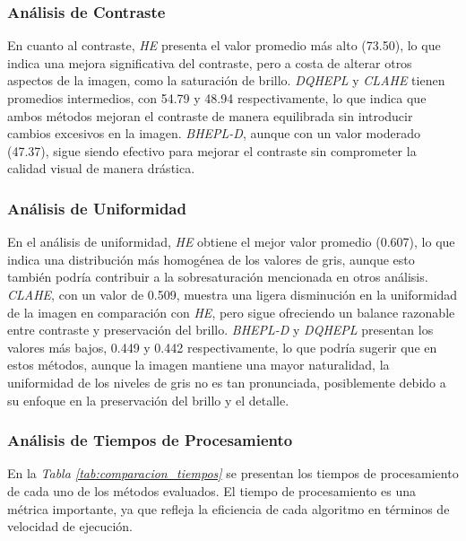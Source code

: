 \documentclass[sigchi]{acmart}
\begin{document}
\subsubsection{\textbf{Análisis de Contraste}}
\label{subsubsec:analisis_contraste}

En cuanto al contraste, \emph{HE} presenta el valor promedio más alto (73.50), lo que indica
una mejora significativa del contraste, pero a costa de alterar otros aspectos de la imagen,
como la saturación de brillo. \emph{DQHEPL} y \emph{CLAHE} tienen promedios intermedios,
con 54.79 y 48.94 respectivamente, lo que indica que ambos métodos mejoran el contraste de
manera equilibrada sin introducir cambios excesivos en la imagen. \emph{BHEPL-D}, aunque con
un valor moderado (47.37), sigue siendo efectivo para mejorar el contraste sin comprometer la
calidad visual de manera drástica.

\subsubsection{\textbf{Análisis de Uniformidad}}
\label{subsubsec:analisis_uniformidad}

En el análisis de uniformidad, \emph{HE} obtiene el mejor valor promedio (0.607), lo que
indica una distribución más homogénea de los valores de gris, aunque esto también podría
contribuir a la sobresaturación mencionada en otros análisis. \emph{CLAHE}, con un valor de
0.509, muestra una ligera disminución en la uniformidad de la imagen en comparación con
\emph{HE}, pero sigue ofreciendo un balance razonable entre contraste y preservación del
brillo. \emph{BHEPL-D} y \emph{DQHEPL} presentan los valores más bajos, 0.449 y 0.442
respectivamente, lo que podría sugerir que en estos métodos, aunque la imagen mantiene una
mayor naturalidad, la uniformidad de los niveles de gris no es tan pronunciada, posiblemente
debido a su enfoque en la preservación del brillo y el detalle.

\subsubsection{\textbf{Análisis de Tiempos de Procesamiento}}
\label{subsubsec:analisis_tiempos}

En la \emph{Tabla \ref{tab:comparacion_tiempos}} se presentan los tiempos de procesamiento de cada uno
de los métodos evaluados. El tiempo de procesamiento es una métrica importante, ya que refleja
la eficiencia de cada algoritmo en términos de velocidad de ejecución.
\end{document}
